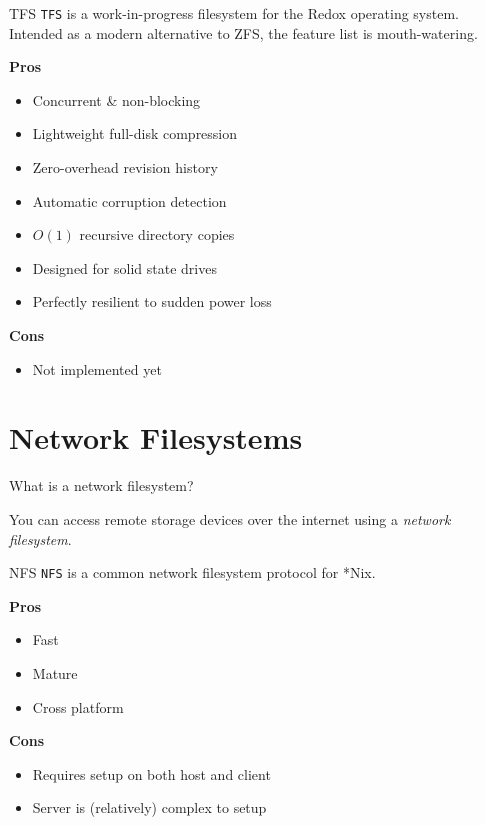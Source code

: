 \documentclass{lug}
\begin{document}
\begin{frame}{TFS}
\texttt{TFS} is a work-in-progress filesystem for the Redox operating system.
Intended as a modern alternative to ZFS, the feature list is mouth-watering.

\textbf{Pros}\begin{itemize}
    \item Concurrent \& non-blocking
    \item Lightweight full-disk compression
    \item Zero-overhead revision history
    \item Automatic corruption detection
    \item $O(1)$ recursive directory copies
    \item Designed for solid state drives
    \item Perfectly resilient to sudden power loss
\end{itemize}

\textbf{Cons}\begin{itemize}
    \item Not implemented yet
\end{itemize}
\end{frame}

\section{Network Filesystems}
\begin{frame}{What is a network filesystem?}
\begin{center}
    You can access remote storage devices over the internet using a
    \emph{network filesystem}.
\end{center}
\end{frame}

\begin{frame}{NFS}
    \texttt{NFS} is a common network filesystem protocol for *Nix.

    \textbf{Pros}
    \begin{itemize}
        \item Fast
        \item Mature
        \item Cross platform
    \end{itemize}

    \textbf{Cons}
    \begin{itemize}
        \item Requires setup on both host and client
        \item Server is (relatively) complex to setup
    \end{itemize}
\end{frame}
\end{document}
